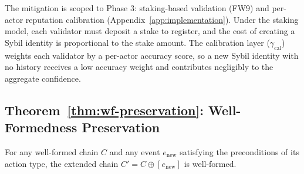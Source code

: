 The mitigation is scoped to Phase 3: staking-based validation (FW9) and per-actor reputation calibration (Appendix~\ref{app:implementation}). Under the staking model, each validator must deposit a stake to register, and the cost of creating a Sybil identity is proportional to the stake amount. The calibration layer ($\gamma_{\text{cal}}$) weights each validator by a per-actor accuracy score, so a new Sybil identity with no history receives a low accuracy weight and contributes negligibly to the aggregate confidence.

\subsection{Theorem~\ref{thm:wf-preservation}: Well-Formedness Preservation}

\begin{theorem}\label{thm:wf-preservation}
For any well-formed chain $C$ and any event $e_{\text{new}}$ satisfying the preconditions of its action type, the extended chain $C' = C \oplus [e_{\text{new}}]$ is well-formed.
\end{theorem}

